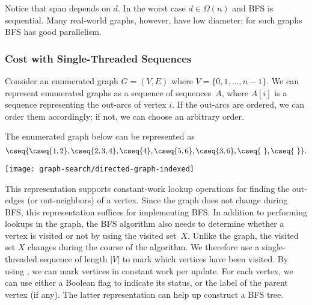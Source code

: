 Notice that span depends on $d$. In the worst case $d \in \Omega(n)$
and BFS is sequential.  Many real-world graphs, however, have low
diameter; for such graphs BFS has good parallelism.

\subsubsection{Cost with Single-Threaded Sequences}

Consider an enumerated graph $G = (V,E)$ where $V =
\{0,1,\ldots,n-1\}$.
%
%
We can represent enumerated graphs as a sequence of sequences~$A$,
where $A[i]$ is a sequence representing the out-arcs of vertex $i$.
%
If the out-arcs are ordered, we can order them accordingly; if not,
we can choose an arbitrary order.

\begin{example}
The enumerated graph below can be represented as  
\[
\cseq{
\cseq{1,2},
\cseq{2,3,4},
\cseq{4},
\cseq{5,6},
\cseq{3,6},
\cseq{~},
\cseq{~}}.
\]


\begin{center}
\texttt{[image: graph-search/directed-graph-indexed]}
\end{center}
\end{example}


This representation supports constant-work lookup operations for
finding the out-edges (or out-neighbors) of a vertex.  
%
Since the graph does not change during BFS, this representation
suffices for implementing BFS. 
%
In addition to performing lookups in the graph, the BFS algorithm also
needs to determine whether a vertex is visited or not by using the
visited set~$X$.  Unlike the graph, the visited set $X$ changes during
the course of the algorithm.  We therefore use a single-threaded
sequence of length $|V|$ to mark which vertices have been visited.  
%
By using , we can mark vertices in constant work per
update. 
%
For each vertex, we can use either a Boolean flag to indicate its
status, or the label of the parent vertex (if any).  The latter
representation can help up construct a BFS tree.



